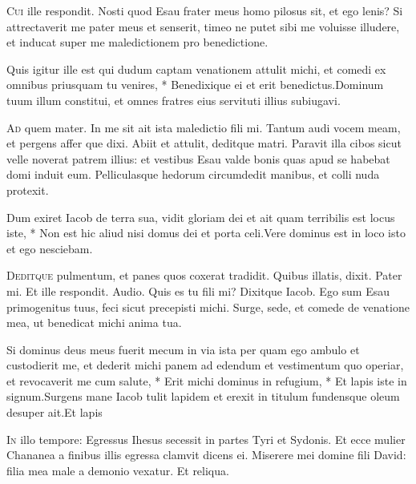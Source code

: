 \begin{multicols*}{2}
\begin{responsory-doxology}
\end{responsory-doxology}
\lettrine[lines=2]{\zallmancaps \color{Blue} C}{ui} ille respondit. Nosti quod Esau frater meus homo pilosus sit, et ego lenis? Si attrectaverit me pater meus et senserit, timeo ne putet sibi me voluisse illudere, et inducat super me maledictionem pro benedictione.
\begin{responsory}%
{Quis igitur ille est qui dudum captam venationem attulit michi, et comedi ex omnibus priusquam tu venires, * Benedixique ei et erit benedictus.}{Dominum tuum illum constitui, et omnes fratres eius servituti illius subiugavi.}
\end{responsory}
\lettrine[lines=2]{\zallmancaps \color{Red} A}{d} quem mater. In me sit ait ista maledictio fili mi. Tantum audi vocem meam, et pergens affer que dixi. Abiit et attulit, deditque matri. Paravit illa cibos sicut velle noverat patrem illius: et vestibus Esau valde bonis quas apud se habebat domi induit eum. Pelliculasque hedorum circumdedit manibus, et colli nuda protexit.
\begin{responsory}
{Dum exiret Iacob de terra sua, vidit gloriam dei et ait quam terribilis est locus iste, * Non est hic aliud nisi domus dei et porta celi.}{Vere dominus est in loco isto et ego nesciebam.}
\end{responsory}
\lettrine[lines=2]{\zallmancaps \color{Blue} D}{editque} pulmentum, et panes quos coxerat tradidit. Quibus illatis, dixit. Pater mi. Et ille respondit. Audio. Quis es tu fili mi? Dixitque Iacob. Ego sum Esau primogenitus tuus, feci sicut precepisti michi. Surge, sede, et comede de venatione mea, ut benedicat michi anima tua.
\begin{responsory-final}
{Si dominus deus meus fuerit mecum in via ista per quam ego ambulo et custodierit me, et dederit michi panem ad edendum et vestimentum quo operiar, et revocaverit me cum salute, * Erit michi dominus in refugium, * Et lapis iste in signum.}{Surgens mane Iacob tulit lapidem et erexit in titulum fundensque oleum desuper ait.}{Et lapis}
\end{responsory-final}
\lettrine[lines=2]{\zallmancaps \color{Red} I}{n} illo tempore: Egressus Ihesus secessit in partes Tyri et Sydonis. Et ecce mulier Chananea a finibus illis egressa clamvit dicens ei. Miserere mei domine fili David: filia mea male a demonio vexatur. Et reliqua.

\end{multicols*}
